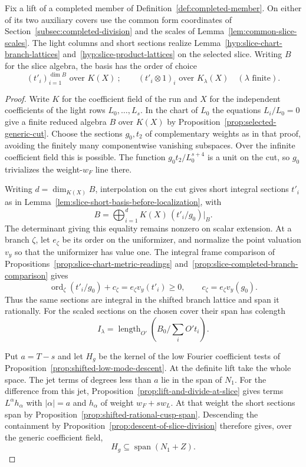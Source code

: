 \begin{auxlemma}
\label{lem:parent-slice-lattices}
Fix a lift of a completed member of Definition~\ref{def:completed-member}.
On either of its two auxiliary covers use the common form coordinates
of Section~\ref{subsec:completed-division} and the scales of
Lemma~\ref{lem:common-slice-scales}. The light columns and short
sections realize Lemma~\ref{hyp:slice-chart-branch-lattices}
and~\ref{hyp:slice-product-lattices} on the selected slice.
Writing \(B\) for the slice algebra, the basis has the order of choice
\[
 (t'_i)_{i=1}^{\dim B}\text{ over }K(X)\ ;\qquad
 (t'_i\otimes1)_i\text{ over }K_\lambda(X)\quad(\lambda\text{ finite}).
\]
\end{auxlemma}

\begin{proof}
Write \(K\) for the coefficient field of the run and \(X\) for
the independent coefficients of the light rows \(L_0,\ldots,L_s\).
In the chart of \(L_0\) the equations \(L_i/L_0=0\)
give a finite reduced algebra \(B\) over \(K(X)\) by
Proposition~\ref{prop:selected-generic-cut}. Choose the sections \(g_0,t_2\) of complementary weights as in that proof, avoiding the finitely many componentwise vanishing subspaces. Over the infinite coefficient field this is possible. The function \(g_0t_2/L_0^{s+4}\) is a unit on the cut, so \(g_0\) trivializes the weight-\(w_F\) line there.

Writing \(d=\dim_{K(X)} B\), interpolation on the cut gives short
integral sections \(t'_i\) as in
Lemma~\ref{lem:slice-short-basis-before-localization}, with
\[
   B=\bigoplus_{i=1}^{d}K(X)\,(t'_i/g_0)|_B .
\]
The determinant giving this equality remains nonzero on scalar
extension. At a branch \(\zeta\), let \(e_\zeta\) be its order on
the uniformizer, and normalize the point valuation \(v_y\) so that
the uniformizer has value one. The integral frame comparison of
Propositions~\ref{prop:slice-chart-metric-readings}
and~\ref{prop:slice-completed-branch-comparison} gives
\[
  \operatorname{ord}_\zeta(t'_i/g_0)+c_\zeta
       =e_\zeta v_y(t'_i)\ge0,\qquad c_\zeta=e_\zeta v_y(g_0).
\]
Thus the same sections are integral in the shifted branch lattice
and span it rationally. For the scaled sections on the chosen cover their span has colength
\[
 I_\lambda=\operatorname{length}_{O'}(B_0/\textstyle\sum_i O't_i).
\]

Put \(a=T-s\) and let \(H_g\) be the kernel of the low Fourier
coefficient tests of Proposition~\ref{prop:shifted-low-mode-descent}.
At the definite lift take the whole space. The jet terms of
degrees less than \(a\) lie in the span of \(N_1\).
For the difference from this jet, Proposition~\ref{prop:lift-and-divide-at-slice}
gives terms \(L^\alpha h_\alpha\) with \(|\alpha|=a\) and
\(h_\alpha\) of weight \(w_F+s w_L\). At that weight the short
sections span by Proposition~\ref{prop:shifted-rational-cusp-span}.
Descending the containment by Proposition~\ref{prop:descent-of-slice-division}
therefore gives, over the generic coefficient field,
\[
              H_g\subseteq \operatorname{span}(N_1+Z).
\]


\end{proof}
